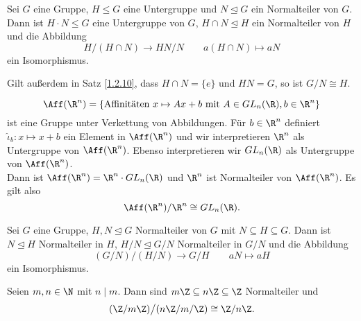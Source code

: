 \begin{thm}[1. Isomorphiesatz]\label{1.2.10}
	Sei $G$ eine Gruppe, $H \leq G$ eine Untergruppe und $N \unlhd G$ ein Normalteiler von $G$. Dann ist $H \cdot N \leq G$ eine Untergruppe von $G$, $H \cap N \unlhd H$ ein Normalteiler von $H$ und die Abbildung
	\[ H/(H \cap N) \to HN/N \qquad a(H \cap N) \mapsto aN \]
	ein Isomorphismus.
\end{thm}

\begin{rem*}
	Gilt außerdem in Satz \ref{1.2.10}, dass $H \cap N = \{e\}$ und $HN = G$, so ist $G/N \cong H$.
\end{rem*}

\begin{exmp*}
	\[ \Aff(\R^n) = \{\text{Affinitäten } x \mapsto Ax + b\ \text{mit } A \in GL_n(\R), b \in \R^n\} \]
	ist eine Gruppe unter Verkettung von Abbildungen. Für $b \in \R^n$ definiert $\hat{\iota}_b: x \mapsto x+b$ ein Element in $\Aff(\R^n)$ und wir interpretieren $\R^n$ als Untergruppe von $\Aff(\R^n)$. Ebenso interpretieren wir $GL_n(\R)$ als Untergruppe von $\Aff(\R^n)$.\\
	Dann ist $ \Aff(\R^n) = \R^n \cdot GL_n(\R) $ und $\R^n$ ist Normalteiler von $\Aff(\R^n)$. Es gilt also
	\[ \Aff(\R^n) / \R^n \cong GL_n(\R). \]
\end{exmp*}

\begin{thm}[2. Isomorphiesatz]
	Sei $G$ eine Gruppe, $H,N \unlhd G$ Normalteiler von $G$ mit $N \subseteq H \subseteq G$. Dann ist $N \unlhd H$ Normalteiler in $H$, $H/N \unlhd G/N$ Normalteiler in $G/N$ und die Abbildung
	\[ (G/N)\big/(H/N) \to G/H \qquad aN \mapsto  aH \]
	ein Isomorphismus.
\end{thm}

\begin{exmp*}
	Seien $ m,n \in \N $ mit $n \mid m$. Dann sind $m\Z \subseteq n\Z \subseteq \Z$ Normalteiler und 
	\[ (\Z/m\Z)\big/(n\Z/m/\Z) \cong \Z/n\Z. \]
\end{exmp*}